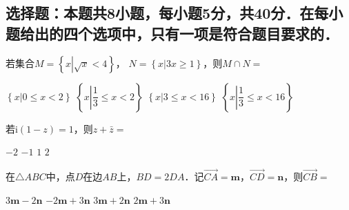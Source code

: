 \documentclass[11pt,addpoints,answers]{exam}
\begin{document}
\CorrectChoiceEmphasis{\color{red}}

\begin{multicols}{3}

    {\centering {}

        \centering {}

        \centering {}

    }

    \begin{questions}
        \section{选择题：本题共8小题，每小题5分，共40分．在每小题给出的四个选项中，只有一项是符合题目要求的．}

        \question
        若集合$M=\left\{ x\left|\sqrt{x}<4\right. \right\}$， $N=\left\{x\left|3x \geqslant 1\right.\right\}$，则$M\cap N=$

        \begin{oneparchoices}
            \choice $\left\{ x\left|0\leqslant x<2\right. \right\}$
            \choice $\left\{ x\left|\dfrac{1}{3}\leqslant x<2\right. \right\}$
            \choice $\left\{ x\left|3\leqslant x<16\right. \right\}$
            \correctchoice $\left\{ x\left|\dfrac{1}{3}\leqslant x<16\right. \right\}$
        \end{oneparchoices}


        \question
        若$\mathrm{i} \left( 1 - z \right)=1$，则$z+\bar{z}=$

        \begin{oneparchoices}
            \choice $-2$
            \choice $-1$
            \choice $1$
            \choice $2$
        \end{oneparchoices}

        \question
        在$\triangle ABC$中，点$D$在边$AB$上，$BD=2DA$．记$\overrightarrow{CA}=\boldsymbol{m}$，$\overrightarrow{CD}=\boldsymbol{n}$，则$\overrightarrow{CB}=$

        \begin{oneparchoices}
            \choice $3\boldsymbol{m}-2\boldsymbol{n}$
            \choice $-2\boldsymbol{m}+3\boldsymbol{n}$
            \choice $3\boldsymbol{m}+2\boldsymbol{n}$
            \choice $2\boldsymbol{m}+3\boldsymbol{n}$
        \end{oneparchoices}


\end{questions}
\end{multicols}
\end{document}
